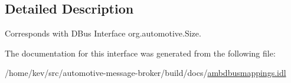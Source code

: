 \subsection{Detailed Description}
Corresponds with D\+Bus Interface org.\+automotive.\+Size. 

The documentation for this interface was generated from the following file\+:\begin{DoxyCompactItemize}
\item 
/home/kev/src/automotive-\/message-\/broker/build/docs/\hyperlink{ambdbusmappings_8idl}{ambdbusmappings.\+idl}\end{DoxyCompactItemize}
